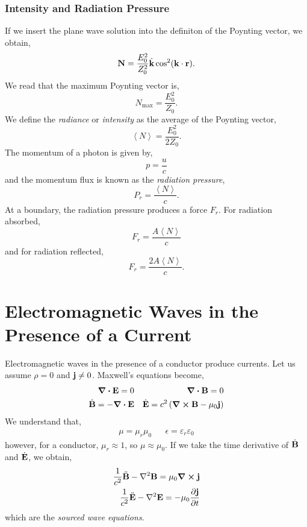 \documentclass{book}
\begin{document}
\subsubsection{Intensity and Radiation Pressure}
If we insert the plane wave solution into the definiton of the Poynting vector, we obtain,
\begin{equation}
	\vb{N} = \frac{E_0^2}{Z_0^2}\hat{\vb{k}}\cos^2(\vb{k}\cdot{\vb{r}}).
\end{equation}
We read that the maximum Poynting vector is,
\begin{equation}
	N_{\text{max}} = \frac{E_0^2}{Z_0}.
\end{equation}
We define the \textit{radiance} or \textit{intensity} as the average of the Poynting vector,
\begin{equation}
	\left<N\right> = \frac{E_0^2}{2Z_0}.
\end{equation}
The momentum of a photon is given by,
\begin{equation}
	p = \frac{u}{c}
\end{equation}
and the momentum flux is known as the \textit{radiation pressure},
\begin{equation}
	P_r = \frac{\left<N\right>}{c}.
\end{equation}
At a boundary, the radiation pressure produces a force $F_r$. For radiation absorbed,
\begin{equation}
	F_r = \frac{A\left<N\right>}{c}
\end{equation}
and for radiation reflected,
\begin{equation}
	F_r = \frac{2A\left<N\right>}{c}.
\end{equation}
\section{Electromagnetic Waves in the Presence of a Current}
Electromagnetic waves in the presence of a conductor produce currents. Let us assume $\rho = 0$ and $\vb{j} \neq 0$. Maxwell's equations become,
\begin{align}
	\div{\vb{E}} = 0 && \div{\vb{B}} = 0 \\
	\Dot{\vb{B}} = -\div{\vb{E}} && \Dot{\vb{E}} = c^2\left(\curl{\vb{B}} - \mu_0\vb{j}\right)
\end{align}
We understand that,
\begin{align}
	\mu = \mu_r\mu_0 && \epsilon = \varepsilon_r \varepsilon_0 
\end{align}
however, for a conductor, $\mu_r \approx 1$, so $\mu \approx \mu_0$. If we take the time derivative of $\Dot{\vb{B}}$ and $\Dot{\vb{E}}$, we obtain,
\begin{align}
	\frac{1}{c^2}\Ddot{\vb{B}} - \laplacian{\vb{B}} = \mu_0\curl{\vb{j}} \label{eq:sourced E}\\
	\frac{1}{c^2}\Ddot{\vb{E}} - \laplacian{\vb{E}} = -\mu_0 \pdv{\vb{j}}{t}
\end{align}
which are the \textit{sourced wave equations}.
\end{document}
